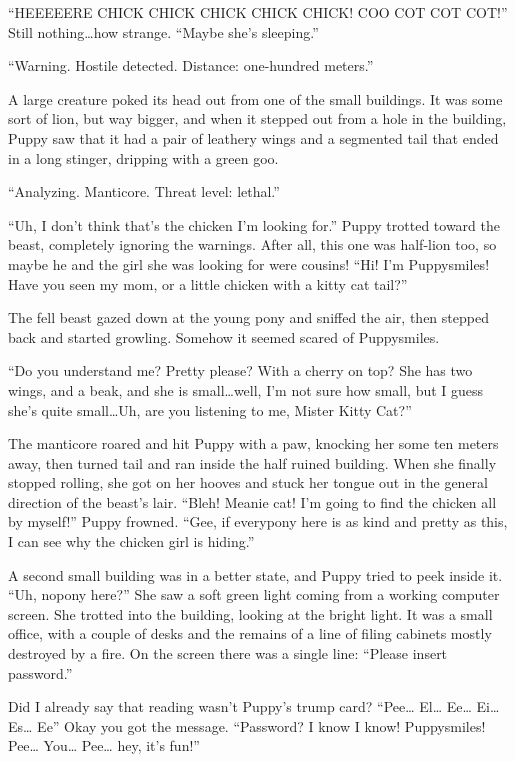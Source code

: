 ``HEEEEERE CHICK CHICK CHICK CHICK CHICK! COO COT COT COT!'' Still nothing\dots how strange. ``Maybe she's sleeping.''

{\mten ``Warning. Hostile detected. Distance: one-hundred meters.''}

A large creature poked its head out from one of the small buildings. It was some sort of lion, but way bigger, and when it stepped out from a hole in the building, Puppy saw that it had a pair of leathery wings and a segmented tail that ended in a long stinger, dripping with a green goo.

{\mten ``Analyzing. Manticore. Threat level: lethal.''}

``Uh, I don't think that's the chicken I'm looking for.'' Puppy trotted toward the beast, completely ignoring the warnings. After all, this one was half-lion too, so maybe he and the girl she was looking for were cousins! ``Hi! I'm Puppysmiles! Have you seen my mom, or a little chicken with a kitty cat tail?''

The fell beast gazed down at the young pony and sniffed the air, then stepped back and started growling. Somehow it seemed scared of Puppysmiles.

``Do you understand me? Pretty please? With a cherry on top? She has two wings, and a beak, and she is small\dots well, I'm not sure how small, but I guess she's quite small\dots Uh, are you listening to me, Mister Kitty Cat?''

The manticore roared and hit Puppy with a paw, knocking her some ten meters away, then turned tail and ran inside the half ruined building. When she finally stopped rolling, she got on her hooves and stuck her tongue out in the general direction of the beast's lair. ``Bleh! Meanie cat! I'm going to find the chicken all by myself!'' Puppy frowned. ``Gee, if everypony here is as kind and pretty as this, I can see why the chicken girl is hiding.''

A second small building was in a better state, and Puppy tried to peek inside it. ``Uh, nopony here?'' She saw a soft green light coming from a working computer screen. She trotted into the building, looking at the bright light. It was a small office, with a couple of desks and the remains of a line of filing cabinets mostly destroyed by a fire. On the screen there was a single line: ``Please insert password.''

Did I already say that reading wasn't Puppy's trump card? ``Pee\dots{} El\dots{} Ee\dots{} Ei\dots{} Es\dots{} Ee'' Okay you got the message. ``Password? I know I know! Puppysmiles! Pee\dots{} You\dots{} Pee\dots{} hey, it's fun!''

